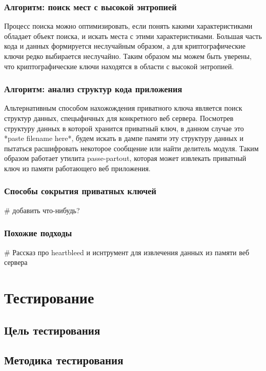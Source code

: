 \documentclass[20pt]{article}
\begin{document}
\subsubsection{Алгоритм: поиск мест с высокой энтропией}
Процесс поиска можно оптимизировать, если понять какими характеристиками обладает
объект поиска, и искать места с этими характеристиками. Большая часть кода и данных
формируется неслучайным образом, а для криптографические ключи редко выбирается
неслучайно. Таким образом мы можем быть уверены, что криптографические ключи находятся
в области с высокой энтропией.

\subsubsection{Алгоритм: анализ структур кода приложения}
Альтернативным способом нахожождения приватного ключа является поиск структур
данных, спецыфичных для конкретного веб сервера. Посмотрев структуру данных в которой
хранится приватный ключ, в данном случае это *paste filename here*, будем искать
в дампе памяти эту структуру данных и пытаться расшифровать некоторое сообщение
или найти делитель модуля. Таким образом работает утилита passe-partout, которая
может извлекать приватный ключ из памяти работающего веб приложения.

\subsubsection{Способы сокрытия приватных ключей}
\# добавить что-нибудь?

\subsubsection{Похожие подходы}
\# Рассказ про heartbleed и иснтрумент для извлечения данных из памяти веб сервера

\newpage

\section{Тестирование}
\subsection{Цель тестирования}


\subsection{Методика тестирования}
\end{document}
